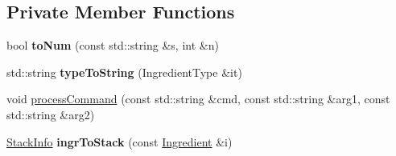 \subsection*{Private Member Functions}
\begin{DoxyCompactItemize}
\item 
\hypertarget{classRecipe_a6ee1977ac26a346bfc451b8f694bc692}{bool {\bfseries to\-Num} (const std\-::string \&s, int \&n)}\label{classRecipe_a6ee1977ac26a346bfc451b8f694bc692}

\item 
\hypertarget{classRecipe_ac8471305ea877c360e4f6793ba4c34dd}{std\-::string {\bfseries type\-To\-String} (Ingredient\-Type \&it)}\label{classRecipe_ac8471305ea877c360e4f6793ba4c34dd}

\item 
void \hyperlink{classRecipe_a0057661a832450dc1f2cf4582d16485b}{process\-Command} (const std\-::string \&cmd, const std\-::string \&arg1, const std\-::string \&arg2)
\item 
\hypertarget{classRecipe_a280aeb473fd69ef19df3654a54408d02}{\hyperlink{structStackInfo}{Stack\-Info} {\bfseries ingr\-To\-Stack} (const \hyperlink{classIngredient}{Ingredient} \&i)}\label{classRecipe_a280aeb473fd69ef19df3654a54408d02}


\end{DoxyCompactItemize}
